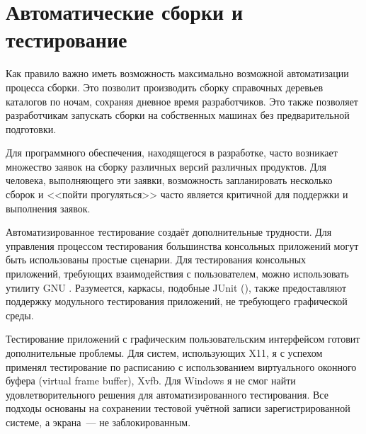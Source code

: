\section{Автоматические сборки и тестирование}

Как правило важно иметь возможность максимально возможной
автоматизации процесса сборки. Это позволит производить сборку
справочных деревьев каталогов по ночам, сохраняя дневное время
разработчиков. Это также позволяет разработчикам запускать сборки на
собственных машинах без предварительной подготовки.

Для программного обеспечения, находящегося в разработке, часто
возникает множество заявок на сборку различных версий различных
продуктов. Для человека, выполняющего эти заявки, возможность
запланировать несколько сборок и <<пойти прогуляться>> часто является
критичной для поддержки и выполнения заявок.

Автоматизированное тестирование создаёт дополнительные трудности.
Для управления процессом тестирования большинства консольных
приложений могут быть использованы простые сценарии. Для тестирования
консольных приложений, требующих взаимодействия с пользователем, можно
использовать утилиту GNU . Разумеется, каркасы,
подобные JUnit (), также
предоставляют поддержку модульного тестирования приложений, не
требующего графической среды.

Тестирование приложений с графическим пользовательским интерфейсом
готовит дополнительные проблемы.  Для систем, использующих X11, я с
успехом применял тестирование по расписанию с использованием
виртуального оконного буфера (virtual frame buffer), Xvfb. Для Windows
я не смог найти удовлетворительного решения для автоматизированного
тестирования. Все подходы основаны на сохранении тестовой учётной
записи зарегистрированной системе, а экрана~--- не заблокированным.
